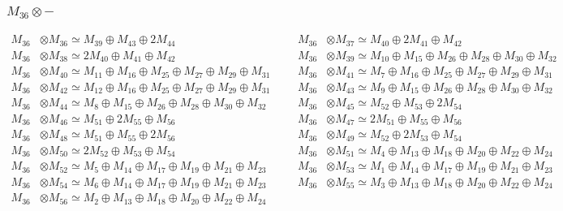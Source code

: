 \subsubsection{$ M_{36}\otimes -$}
\begin{align*}
M_{36} &\otimes M_{36} \simeq M_{39} \oplus M_{43} \oplus 2M_{44} &&& M_{36} &\otimes M_{37} \simeq M_{40} \oplus 2M_{41} \oplus M_{42}\\
M_{36} &\otimes M_{38} \simeq 2M_{40} \oplus M_{41} \oplus M_{42} &&& M_{36} &\otimes M_{39} \simeq M_{10} \oplus M_{15} \oplus M_{26} \oplus M_{28} \oplus M_{30} \oplus M_{32}\\
M_{36} &\otimes M_{40} \simeq M_{11} \oplus M_{16} \oplus M_{25} \oplus M_{27} \oplus M_{29} \oplus M_{31} &&& M_{36} &\otimes M_{41} \simeq M_{7} \oplus M_{16} \oplus M_{25} \oplus M_{27} \oplus M_{29} \oplus M_{31}\\
M_{36} &\otimes M_{42} \simeq M_{12} \oplus M_{16} \oplus M_{25} \oplus M_{27} \oplus M_{29} \oplus M_{31} &&& M_{36} &\otimes M_{43} \simeq M_{9} \oplus M_{15} \oplus M_{26} \oplus M_{28} \oplus M_{30} \oplus M_{32}\\
M_{36} &\otimes M_{44} \simeq M_{8} \oplus M_{15} \oplus M_{26} \oplus M_{28} \oplus M_{30} \oplus M_{32} &&& M_{36} &\otimes M_{45} \simeq M_{52} \oplus M_{53} \oplus 2M_{54}\\
M_{36} &\otimes M_{46} \simeq M_{51} \oplus 2M_{55} \oplus M_{56} &&& M_{36} &\otimes M_{47} \simeq 2M_{51} \oplus M_{55} \oplus M_{56}\\
M_{36} &\otimes M_{48} \simeq M_{51} \oplus M_{55} \oplus 2M_{56} &&& M_{36} &\otimes M_{49} \simeq M_{52} \oplus 2M_{53} \oplus M_{54}\\
M_{36} &\otimes M_{50} \simeq 2M_{52} \oplus M_{53} \oplus M_{54} &&& M_{36} &\otimes M_{51} \simeq M_{4} \oplus M_{13} \oplus M_{18} \oplus M_{20} \oplus M_{22} \oplus M_{24}\\
M_{36} &\otimes M_{52} \simeq M_{5} \oplus M_{14} \oplus M_{17} \oplus M_{19} \oplus M_{21} \oplus M_{23} &&& M_{36} &\otimes M_{53} \simeq M_{1} \oplus M_{14} \oplus M_{17} \oplus M_{19} \oplus M_{21} \oplus M_{23}\\
M_{36} &\otimes M_{54} \simeq M_{6} \oplus M_{14} \oplus M_{17} \oplus M_{19} \oplus M_{21} \oplus M_{23} &&& M_{36} &\otimes M_{55} \simeq M_{3} \oplus M_{13} \oplus M_{18} \oplus M_{20} \oplus M_{22} \oplus M_{24}\\
M_{36} &\otimes M_{56} \simeq M_{2} \oplus M_{13} \oplus M_{18} \oplus M_{20} \oplus M_{22} \oplus M_{24}
\end{align*}

